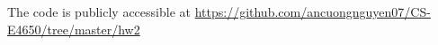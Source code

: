 The code is publicly accessible at \url{https://github.com/ancuongnguyen07/CS-E4650/tree/master/hw2}